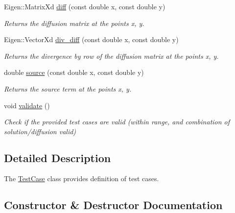 \begin{DoxyCompactItemize}
Eigen\+::\+Matrix\+Xd \hyperlink{classTestCase_a74093020578afb0e658ae1dc77011b8a}{diff} (const double x, const double y)
\begin{DoxyCompactList}\small\item\em Returns the diffusion matrix at the points x, y. \end{DoxyCompactList}\item 
\mbox{\label{classTestCase_a8a7a5456cfd75fa939179119a9c65955}} 
Eigen\+::\+Vector\+Xd \hyperlink{classTestCase_a8a7a5456cfd75fa939179119a9c65955}{div\+\_\+diff} (const double x, const double y)
\begin{DoxyCompactList}\small\item\em Returns the divergence by row of the diffusion matrix at the points x, y. \end{DoxyCompactList}\item 
\mbox{\label{classTestCase_a0f23ed8e9ad5e04e6599f4cd90fd5fd4}} 
double \hyperlink{classTestCase_a0f23ed8e9ad5e04e6599f4cd90fd5fd4}{source} (const double x, const double y)
\begin{DoxyCompactList}\small\item\em Returns the source term at the points x, y. \end{DoxyCompactList}\item 
\mbox{\label{classTestCase_a1f428652eb476f6eb4973ef1f478e8ce}} 
void \hyperlink{classTestCase_a1f428652eb476f6eb4973ef1f478e8ce}{validate} ()
\begin{DoxyCompactList}\small\item\em Check if the provided test cases are valid (within range, and combination of solution/diffusion valid) \end{DoxyCompactList}\end{DoxyCompactItemize}


\subsection{Detailed Description}
The \hyperlink{classTestCase}{Test\+Case} class provides definition of test cases. 

\subsection{Constructor \& Destructor Documentation}
\mbox{\label{classTestCase_aa4ad29533416ee515205db87002a1bf1}} 
